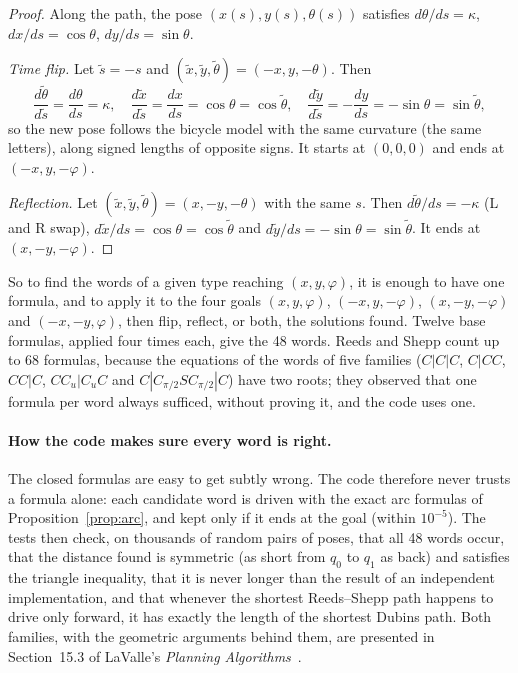 \begin{proof}
  Along the path, the pose $(x(s), y(s), \theta(s))$ satisfies
  $d\theta/ds = \kappa$, $dx/ds = \cos\theta$, $dy/ds = \sin\theta$.

  \emph{Time flip.} Let $\tilde s = -s$ and $(\tilde x, \tilde y,
  \tilde\theta) = (-x, y, -\theta)$. Then
  \[
    \frac{d\tilde\theta}{d\tilde s} = \frac{d\theta}{ds} = \kappa, \quad
    \frac{d\tilde x}{d\tilde s} = \frac{dx}{ds} = \cos\theta
      = \cos\tilde\theta, \quad
    \frac{d\tilde y}{d\tilde s} = -\frac{dy}{ds} = -\sin\theta
      = \sin\tilde\theta,
  \]
  so the new pose follows the bicycle model with the same curvature (the
  same letters), along signed lengths of opposite signs. It starts at
  $(0, 0, 0)$ and ends at $(-x, y, -\varphi)$.

  \emph{Reflection.} Let $(\tilde x, \tilde y, \tilde\theta) = (x, -y,
  -\theta)$ with the same $s$. Then $d\tilde\theta/ds = -\kappa$ (L and R
  swap), $d\tilde x/ds = \cos\theta = \cos\tilde\theta$ and $d\tilde y/ds =
  -\sin\theta = \sin\tilde\theta$. It ends at $(x, -y, -\varphi)$.
\end{proof}

So to find the words of a given type reaching $(x, y, \varphi)$, it is enough
to have one formula, and to apply it to the four goals $(x, y, \varphi)$,
$(-x, y, -\varphi)$, $(x, -y, -\varphi)$ and $(-x, -y, \varphi)$, then flip,
reflect, or both, the solutions found. Twelve base formulas, applied four
times each, give the 48 words. Reeds and Shepp count up to 68 formulas,
because the equations of the words of five families ($C|C|C$, $C|CC$,
$CC|C$, $CC_u|C_uC$ and $C|C_{\pi/2}SC_{\pi/2}|C$) have two roots; they
observed that one formula per word always sufficed, without proving it, and
the code uses one.

\paragraph{How the code makes sure every word is right.}
The closed formulas are easy to get subtly wrong. The code therefore never
trusts a formula alone: each candidate word is driven with the exact arc
formulas of Proposition~\ref{prop:arc}, and kept only if it ends at the goal
(within $10^{-5}$). The tests then check, on thousands of random pairs of
poses, that all 48 words occur, that the distance found is symmetric
(as short from $q_0$ to $q_1$ as back) and satisfies the triangle
inequality, that it is never longer than the result of an independent
implementation, and that whenever the shortest Reeds--Shepp path happens to
drive only forward, it has exactly the length of the shortest Dubins path.
Both families, with the geometric arguments behind them, are presented in
Section~15.3 of LaValle's \emph{Planning Algorithms}~\cite{lavalle2006planning}.

